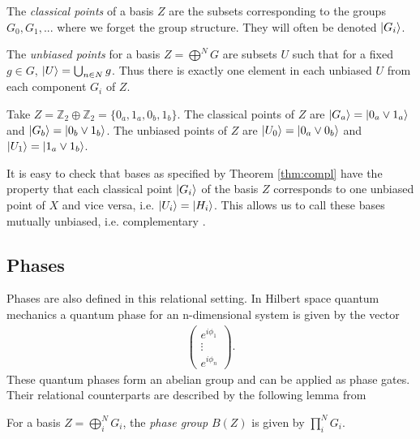 \begin{corollary}
The \emph{classical points} of a basis $Z$ are the subsets corresponding to the groups $G_0, G_1,...$ where we forget the group structure. They will often be denoted $| G_i \rangle$.
\end{corollary}

\begin{corollary}
The \emph{unbiased points} for a basis $Z = \bigoplus^{N}G$ are subsets $U$ such that for a fixed $g\in G$, $| U \rangle = \bigcup_{n\in N}g$.
Thus there is exactly one element in each unbiased $U$ from each component $G_i$ of $Z$.
\end{corollary}

\begin{example}
Take $Z = \mathbb{Z}_2\oplus\mathbb{Z}_2=\{0_a,1_a,0_b,1_b\}$. The classical points of $Z$ are $| G_a \rangle=| 0_a\vee1_a \rangle$ and $| G_b \rangle=| 0_b\vee1_b \rangle$.  The unbiased points of $Z$ are $| U_0 \rangle=| 0_a\vee0_b \rangle$ and $| U_1 \rangle=| 1_a\vee1_b \rangle$.
\end{example}

It is easy to check that bases as specified by Theorem \ref{thm:compl} have the property that each classical point $| G_i \rangle$ of the basis $Z$ corresponds to one unbiased point of $X$ and vice versa, i.e. $| U_i \rangle=| H_i \rangle$.
This allows us to call these bases mutually unbiased, i.e. complementary \cite{evans2009classifying}.
\subsection{Phases}

Phases are also defined in this relational setting.  In Hilbert space quantum mechanics a quantum phase for an n-dimensional system is given by the vector
\begin{align*}
\left(\begin{array}{c}
e^{i\phi_1} \\
\vdots \\
e^{i\phi_n}
\end{array}
\right).
\end{align*}
These quantum phases form an abelian group and can be applied as phase gates.
Their relational counterparts are described by the following lemma from %
\begin{lemma}
For a basis $Z=\bigoplus_i^NG_i$, the \emph{phase group} $B(Z)$ is given by $\prod_i^NG_i$.
\end{lemma}

